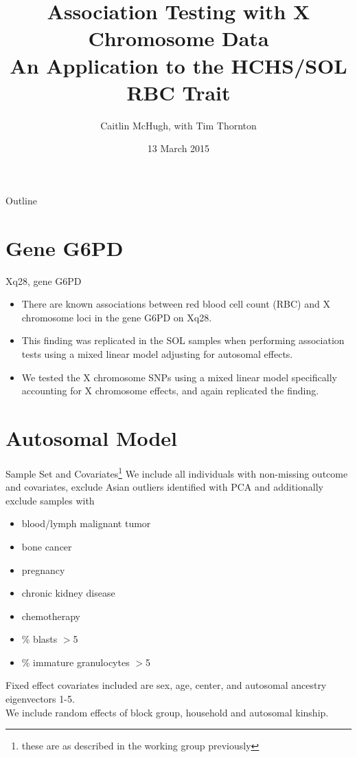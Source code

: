 \documentclass{beamer}
\title[Association Testing with X Chromosome Data] %
{Association Testing with X Chromosome Data\\
An Application to the HCHS/SOL RBC Trait}
\author[Caitlin McHugh, with Tim Thornton] %
{Caitlin McHugh, with Tim Thornton}
\institute[University of Washington] %
{
  Department of Biostatistics\\
  University of Washington
}
\date[Short Occasion] %
{13 March 2015}
\begin{document}
\begin{frame}
  \titlepage
\end{frame}

\begin{frame}{Outline}
\tableofcontents
\end{frame}

\section{Gene G6PD}
\begin{frame}{Xq28, gene G6PD}
\begin{itemize}
\item There are known associations between red blood cell count (RBC) and X chromosome loci in the gene G6PD on Xq28. 
\item This finding was replicated in the SOL samples when performing association tests using a mixed linear model adjusting for autosomal effects.
\item We tested the X chromosome SNPs using a mixed linear model specifically accounting for X chromosome effects, and again replicated the finding.
\end{itemize}
\end{frame}

\section{Autosomal Model}
\begin{frame}{Sample Set and Covariates\footnote{these are as described in the working group previously}}
We include all individuals with non-missing outcome and covariates, exclude Asian outliers identified with PCA and additionally exclude samples with
\begin{itemize}
\item blood/lymph malignant tumor
\item bone cancer
\item pregnancy
\item chronic kidney disease
\item chemotherapy
\item \% blasts $>$5
\item \% immature granulocytes $>$5
\end{itemize}
Fixed effect covariates included are sex, age, center, and autosomal ancestry eigenvectors 1-5.\\
We include random effects of block group, household and autosomal kinship.
\end{frame}
\end{document}
